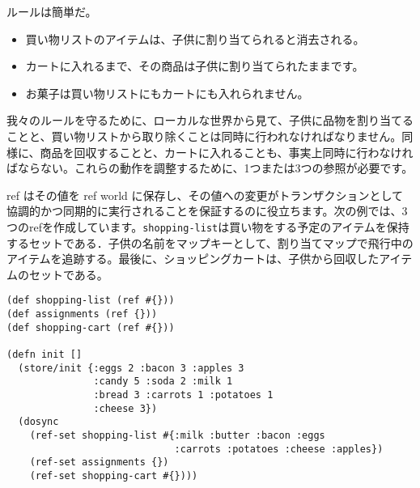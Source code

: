 ルールは簡単だ。

\begin{itemize}
\item 買い物リストのアイテムは、子供に割り当てられると消去される。

\item カートに入れるまで、その商品は子供に割り当てられたままです。

\item お菓子は買い物リストにもカートにも入れられません。
\end{itemize}

我々のルールを守るために、ローカルな世界から見て、子供に品物を割り当てることと、買い物リストから取り除くことは同時に行われなければなりません。同様に、商品を回収することと、カートに入れることも、事実上同時に行わなければならない。これらの動作を調整するために、1つまたは3つの参照が必要です。

ref はその値を ref world に保存し、その値への変更がトランザクションとして協調的かつ同期的に実行されることを保証するのに役立ちます。次の例では、3つのrefを作成しています。\texttt{shopping-list}は買い物をする予定のアイテムを保持するセットである．子供の名前をマップキーとして、割り当てマップで飛行中のアイテムを追跡する。最後に、ショッピングカートは、子供から回収したアイテムのセットである。


\begin{lstlisting}[numbers=none]
(def shopping-list (ref #{}))
(def assignments (ref {}))
(def shopping-cart (ref #{}))

(defn init []
  (store/init {:eggs 2 :bacon 3 :apples 3
               :candy 5 :soda 2 :milk 1
               :bread 3 :carrots 1 :potatoes 1
               :cheese 3})
  (dosync
    (ref-set shopping-list #{:milk :butter :bacon :eggs
                             :carrots :potatoes :cheese :apples})
    (ref-set assignments {})
    (ref-set shopping-cart #{})))
\end{lstlisting}


